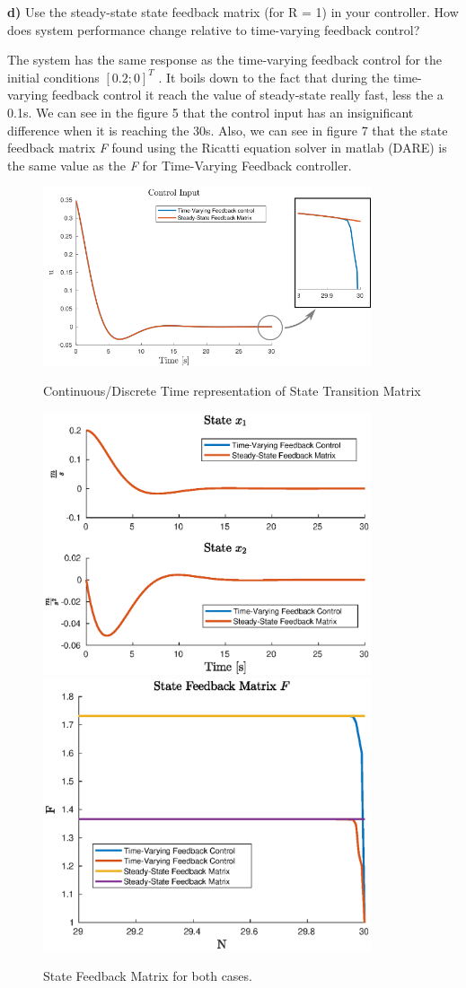 \documentclass{article}
\begin{document}
\textbf{d)	}Use the steady-state state feedback matrix (for R = 1) in your controller. How does system performance change relative to time-varying feedback control?

The system has the same response as the time-varying feedback control for the initial conditions $ [0.2; 0]^T$ . It boils down to the fact that during the time-varying feedback control it reach the value of steady-state really fast, less the a 0.1s. We can see in the figure 5 that the control input has an insignificant difference when it is reaching the 30s. Also, we can see in figure 7 that the state feedback matrix \textit{F} found using the Ricatti equation solver in matlab (DARE) is the same value as the \textit{F} for Time-Varying Feedback controller. 

\begin{figure}[p]
\centering
\includegraphics [width=3.8in]{control_input.png}
\caption{Continuous/Discrete Time representation of State Transition Matrix}
\includegraphics [width=3.8in]{plot2e1.eps}
\includegraphics [width=3.8in]{plot2e2.eps}
\caption{State Feedback Matrix for both cases.}
\end{figure}
\end{document}
